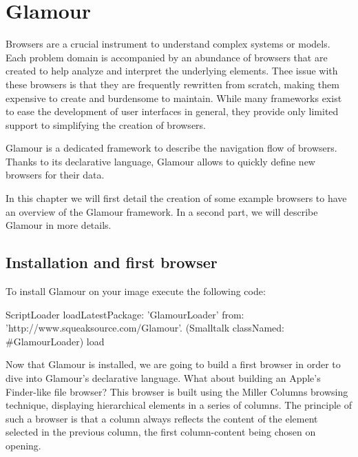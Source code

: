 \documentclass[a4paper,10pt,twoside]{book}
\begin{document}
\fi
\sloppy
\chapter{Glamour}
\label{glamour}
\chapterauthor{\authordamienc{}}

Browsers are a crucial instrument to understand complex systems or
models. Each problem domain is accompanied by an abundance of browsers
that are created to help analyze and interpret the underlying
elements. Thee issue with these browsers is that they are frequently
rewritten from scratch, making them expensive to create and burdensome
to maintain. While many frameworks exist to ease the development of
user interfaces in general, they provide only limited support to
simplifying the creation of browsers.

Glamour is a dedicated framework to describe the navigation flow
of browsers. Thanks to its declarative language, Glamour allows to
quickly define new browsers for their data.

In this chapter we will first detail the creation of some example
browsers to have an overview of the Glamour framework. In a second
part, we will describe Glamour in more details.

\section{Installation and first browser}

To install Glamour on your \pharo{} image execute the following code:

\begin{code}{}
ScriptLoader
  loadLatestPackage: 'GlamourLoader'
  from: 'http://www.squeaksource.com/Glamour'.
(Smalltalk classNamed: #GlamourLoader) load
\end{code}

Now that Glamour is installed, we are going to build a first browser
in order to dive into Glamour's declarative language. What about
building an Apple's Finder-like file browser? This browser is built
using the Miller Columns browsing technique, displaying hierarchical
elements in a series of columns. The principle of such a browser is
that a column always reflects the content of the element selected in
the previous column, the first column-content being chosen on opening.
\end{document}

